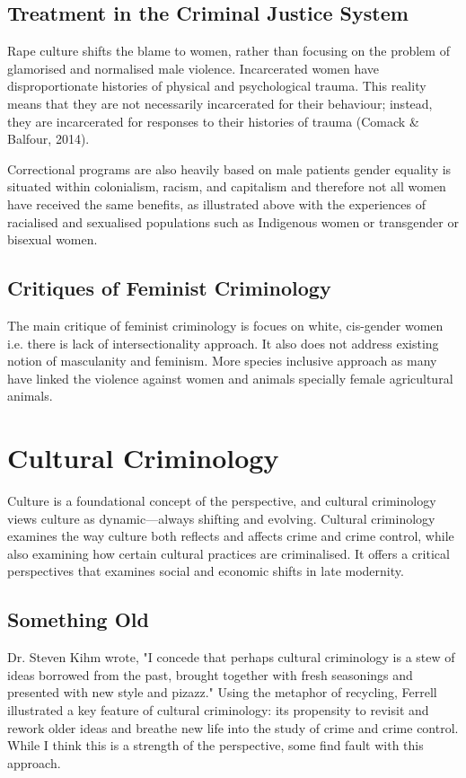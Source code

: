 \documentclass{article}
\begin{document}
\subsection{Treatment in the Criminal Justice System}

Rape culture shifts the blame to women, rather than focusing on the problem of glamorised and normalised male violence. Incarcerated women have disproportionate histories of physical and psychological trauma. This reality means that they are not necessarily incarcerated for their behaviour; instead, they are incarcerated for responses to their histories of trauma (Comack \& Balfour, 2014).

Correctional programs are also heavily based on male patients gender equality is situated within colonialism, racism, and capitalism and therefore not all women have received the same benefits, as illustrated above with the experiences of racialised and sexualised populations such as Indigenous women or transgender or bisexual women.

\subsection{Critiques of Feminist Criminology}

The main critique of feminist criminology is focues on white, cis-gender women i.e. there is lack of intersectionality approach. It also does not address existing notion of masculanity and feminism. More species inclusive approach as many have linked the violence against women and animals specially female agricultural animals.

\section{Cultural Criminology}

Culture is a foundational concept of the perspective, and cultural criminology views culture as dynamic—always shifting and evolving. Cultural criminology examines the way culture both reflects and affects crime and crime control, while also examining how certain cultural practices are criminalised. It offers a critical perspectives that examines social and economic shifts in late modernity.

\subsection{Something Old}

Dr. Steven Kihm wrote, "I concede that perhaps cultural criminology is a stew of ideas borrowed from the past, brought together with fresh seasonings and presented with new style and pizazz." Using the metaphor of recycling, Ferrell illustrated a key feature of cultural criminology: its propensity to revisit and rework older ideas and breathe new life into the study of crime and crime control. While I think this is a strength of the perspective, some find fault with this approach.
\end{document}
